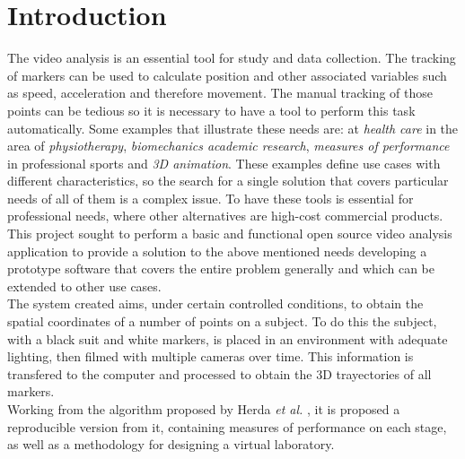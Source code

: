 \section{Introduction}

The video analysis is an essential tool for study and data collection. The tracking of markers can be used to calculate position and other associated variables such as speed, acceleration and therefore movement.
The manual tracking of those points can be tedious so it is necessary to have a tool to perform this task automatically. 
Some examples that illustrate these needs are: at \emph{health care} in the area of \emph{physiotherapy}, \emph{biomechanics academic research},
\emph{measures of performance} in professional sports and \emph{3D animation}.
These examples define use cases with different characteristics, so the search for a single solution that covers particular needs of all of them is a complex issue. To have these tools is essential for professional needs, where other alternatives are high-cost commercial products.\\
\hspace*{0.5cm}This project sought to perform a basic and functional open source video analysis application to provide a solution to the above mentioned needs developing a prototype software that covers the entire problem generally and which can be extended to other use cases.\\
\hspace*{0.5cm}The system created aims, under certain controlled conditions, to obtain the spatial coordinates of a number of points on a subject. To do this the subject, with a black suit and white markers, is placed in an environment with adequate lighting, then filmed with multiple cameras over time. This information is transfered to the computer and processed to obtain the 3D trayectories of all markers.\\
\hspace*{0.5cm}Working from the algorithm proposed by Herda \textit{et al.} \cite{herda}, it is proposed a reproducible version from it, containing measures of performance on each stage, as well as a methodology for designing a virtual laboratory.

